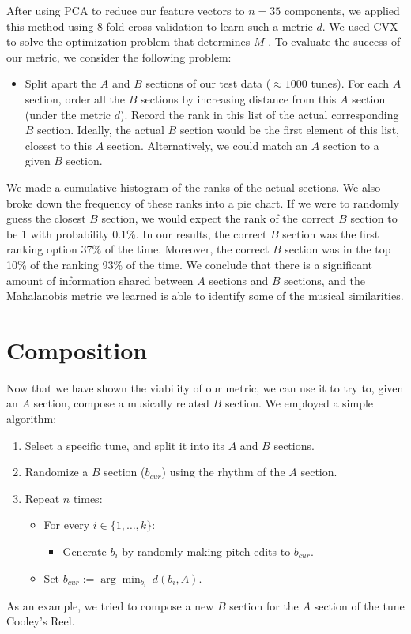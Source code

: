 \documentclass{article} %
\begin{document}
After using PCA to reduce our feature vectors to $n = 35$ components, we applied
this method using 8-fold cross-validation to learn such a metric $d$. We used
CVX to solve the optimization problem that determines $M$ \cite{cvx}.
To evaluate the success of our metric, we consider the following problem:
\begin{itemize}
\item[] Split apart the $A$ and $B$ sections of our test data ($\approx 1000$
tunes). For each $A$ section, order all the $B$ sections by increasing distance
from this $A$ section (under the metric $d$). Record the rank in this list of
the actual corresponding $B$ section. Ideally, the actual $B$ section would be
the first element of this list, closest to this $A$ section. Alternatively, we
could match an $A$ section to a given $B$ section.
\end{itemize}
We made a cumulative histogram of the ranks of the actual sections.%
We also broke down the frequency of these ranks into a pie chart. %
If we were to randomly guess the closest $B$ section, we would expect the rank
of the correct $B$ section to be 1 with probability 0.1\%. In our results, the
correct $B$ section was the first ranking option 37\% of the time. Moreover, the
correct $B$ section was in the top 10\% of the ranking 93\% of the time. We
conclude that there is a significant amount of information shared between $A$
sections and $B$ sections, and the Mahalanobis metric we learned is able to
identify some of the musical similarities.

\section{Composition}
Now that we have shown the viability of our metric, we can use it to try to,
given an $A$ section, compose a musically related $B$ section. We employed a
simple algorithm:
\begin{enumerate}
\item Select a specific tune, and split it into its $A$ and $B$ sections.

\item Randomize a $B$ section ($b_{cur}$) using the rhythm of the $A$ section.

\item Repeat $n$ times:
\begin{itemize}\parskip=0.05in
\item[] For every $i \in \{1, \dots, k\}$:
\begin{itemize}
\item[] Generate $b_i$ by randomly making pitch edits to $b_{cur}$.
\end{itemize}
\item[] Set
$\displaystyle{b_{cur} := \arg \min_{b_i} \  d(b_i, A)}$.
\end{itemize}
\end{enumerate}
As an example, we tried to compose a new $B$ section for the $A$ section of the
tune Cooley's Reel. %
\end{document}
